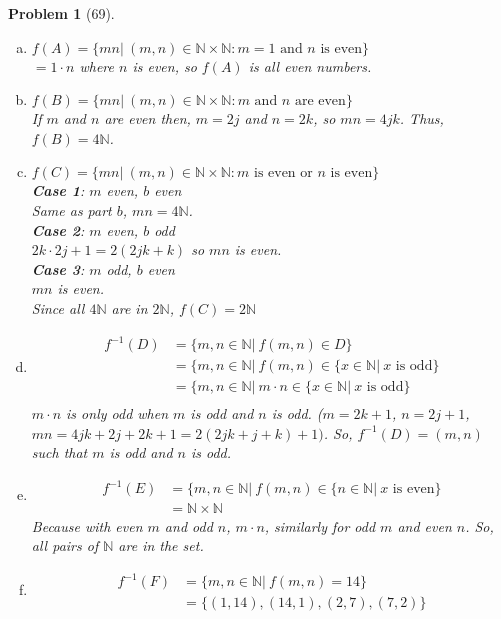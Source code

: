 \documentclass{article}
\theoremstyle{problem}
\newtheorem{prob}{Problem}
\theoremstyle{plain}
\theoremstyle{remark}
\begin{document}
\begin{prob}[69]
\begin{enumerate}[a)]\ \\[-1cm]
\item $f(A) = \{mn|\ (m,n) \in \mathbb{N} \times \mathbb{N}: m = 1 \text{ and } n \text{ is even}\}$\\
$= 1\cdot n$ where $n$ is even, so $f(A)$ is all even numbers.
\item $f(B) = \{mn|\ (m,n) \in \mathbb{N} \times \mathbb{N}: m \text{ and } n \text{ are even}\}$\\
If $m$ and $n$ are even then, $m = 2j$ and $n = 2k$, so $mn = 4jk$. Thus, $f(B) = 4\mathbb{N}$.
\item $f(C) = \{mn|\ (m,n) \in \mathbb{N} \times \mathbb{N}: m \text{ is even or } n \text{ is even}\}$\\
\textbf{Case 1}: $m$ even, $b$ even\\
Same as part $b$, $mn = 4\mathbb{N}$.\\
\textbf{Case 2}: $m$ even, $b$ odd\\
$2k \cdot 2j+1 = 2(2jk + k)$ so $mn$ is even.\\
\textbf{Case 3}: $m$ odd, $b$ even\\
$mn$ is even.\\

Since all $4\mathbb{N}$ are in $2\mathbb{N}$, $f(C) = 2\mathbb{N}$
\item \begin{align*}
    f^{-1}(D) &= \{m,n \in \mathbb{N}|\ f(m,n) \in D\}\\
    &= \{m,n \in \mathbb{N}|\ f(m,n) \in \{x \in \mathbb{N}|\ x \text{ is odd}\}\\  
    &= \{m,n \in \mathbb{N}|\ m\cdot n \in \{x \in \mathbb{N}|\ x \text{ is odd}\}\\  
  \end{align*}
  $m\cdot n$ is only odd when $m$ is odd and $n$ is odd. ($m = 2k + 1$, $n = 2j + 1$, $mn = 4jk + 2j + 2k + 1 = 2(2jk + j + k) + 1)$. So, $f^{-1}(D) = (m,n)$ such that $m$ is odd and $n$ is odd.
\item \begin{align*}
    f^{-1}(E) &= \{m,n \in \mathbb{N}|\ f(m,n) \in \{n \in \mathbb{N}|\ x \text{ is even} \}\\
    &= \mathbb{N} \times \mathbb{N}
  \end{align*}
Because with even $m$ and odd $n$, $m\cdot n$, similarly for odd $m$ and even $n$. So, all pairs of $\mathbb{N}$ are in the set.
\item \begin{align*}
    f^{-1}(F) &= \{m,n \in \mathbb{N}|\ f(m,n) = 14\}\\
    &= \{ (1,14), (14,1), (2,7), (7,2) \}
  \end{align*}
\end{enumerate}
\end{prob}
\end{document}
